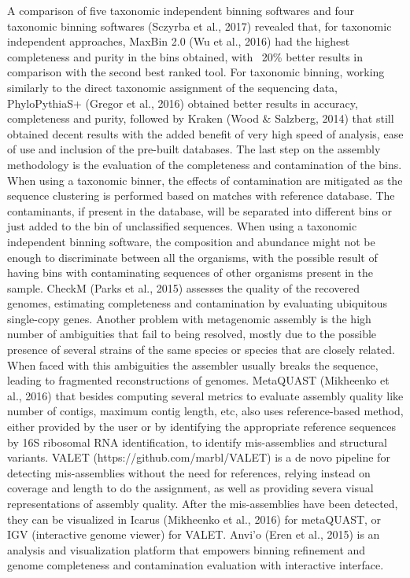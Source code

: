 A comparison of five taxonomic independent binning softwares and four taxonomic binning softwares (Sczyrba et al., 2017) revealed that, for taxonomic independent approaches, MaxBin 2.0 (Wu et al., 2016) had the highest completeness and purity in the bins obtained, with ~20\% better results in comparison with the second best ranked tool. For taxonomic binning, working similarly to the direct taxonomic assignment of the sequencing data, PhyloPythiaS+ (Gregor et al., 2016) obtained better results in accuracy, completeness and purity, followed by Kraken (Wood & Salzberg, 2014) that still obtained decent results with the added benefit of very high speed of analysis, ease of use and inclusion of the pre-built databases.
The last step on the assembly methodology is the evaluation of the completeness and contamination of the bins. When using a taxonomic binner, the effects of contamination are mitigated as the sequence clustering is performed based on matches with reference database. The contaminants, if present in the database, will be separated into different bins or just added to the bin of unclassified sequences. When using a taxonomic independent binning software, the composition and abundance might not be enough to discriminate between all the organisms, with the possible result of having bins with contaminating sequences of other organisms present in the sample. CheckM (Parks et al., 2015) assesses the quality of the recovered genomes, estimating completeness and contamination by evaluating ubiquitous single-copy genes. 
Another problem with metagenomic assembly is the high number of ambiguities that fail to being resolved, mostly due to the possible presence of several strains of the same species or species that are closely related. When faced with this ambiguities the assembler usually breaks the sequence, leading to fragmented reconstructions of genomes. MetaQUAST (Mikheenko et al., 2016) that besides computing several metrics to evaluate assembly quality like number of contigs, maximum contig length, etc, also uses reference-based method, either provided by the user or by identifying the appropriate reference sequences by 16S ribosomal RNA identification, to identify mis-assemblies and structural variants. VALET (https://github.com/marbl/VALET) is a de novo pipeline for detecting mis-assemblies without the need for references, relying instead on coverage and length to do the assignment, as well as providing severa visual representations of assembly quality. After the mis-assemblies have been detected, they can be visualized in Icarus (Mikheenko et al., 2016) for metaQUAST, or IGV (interactive genome viewer) for VALET. Anvi’o (Eren et al., 2015) is an analysis and visualization platform that empowers binning refinement and genome completeness and contamination evaluation with interactive interface. 
